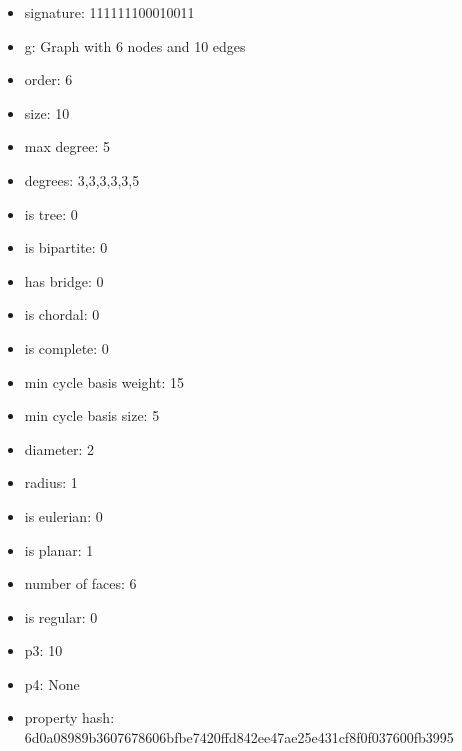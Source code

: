 \begin{itemize}
\item signature: 111111100010011
\item g: Graph with 6 nodes and 10 edges
\item order: 6
\item size: 10
\item max degree: 5
\item degrees: 3,3,3,3,3,5
\item is tree: 0
\item is bipartite: 0
\item has bridge: 0
\item is chordal: 0
\item is complete: 0
\item min cycle basis weight: 15
\item min cycle basis size: 5
\item diameter: 2
\item radius: 1
\item is eulerian: 0
\item is planar: 1
\item number of faces: 6
\item is regular: 0
\item p3: 10
\item p4: None
\item property hash: 6d0a08989b3607678606bfbe7420ffd842ee47ae25e431cf8f0f037600fb3995
\end{itemize}
\newpage
\begin{figure}
\end{figure}
